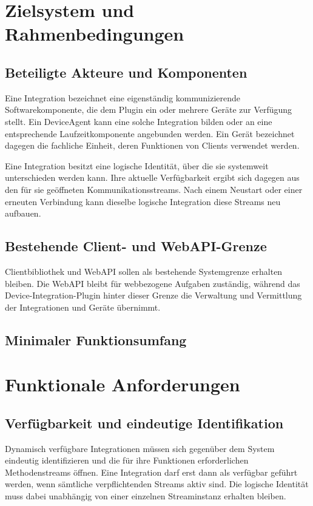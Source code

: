 \section{Zielsystem und Rahmenbedingungen}

\subsection{Beteiligte Akteure und Komponenten}

Eine Integration bezeichnet eine eigenständig kommunizierende Softwarekomponente, die dem Plugin ein oder mehrere Geräte zur Verfügung stellt. Ein DeviceAgent kann eine solche Integration bilden oder an eine entsprechende Laufzeitkomponente angebunden werden. Ein Gerät bezeichnet dagegen die fachliche Einheit, deren Funktionen von Clients verwendet werden.

Eine Integration besitzt eine logische Identität, über die sie systemweit unterschieden werden kann. Ihre aktuelle Verfügbarkeit ergibt sich dagegen aus den für sie geöffneten Kommunikationsstreams. Nach einem Neustart oder einer erneuten Verbindung kann dieselbe logische Integration diese Streams neu aufbauen.

\subsection{Bestehende Client- und WebAPI-Grenze}

Clientbibliothek und WebAPI sollen als bestehende Systemgrenze erhalten bleiben. Die WebAPI bleibt für webbezogene Aufgaben zuständig, während das Device-Integration-Plugin hinter dieser Grenze die Verwaltung und Vermittlung der Integrationen und Geräte übernimmt.

\subsection{Minimaler Funktionsumfang}

\section{Funktionale Anforderungen}

\subsection{Verfügbarkeit und eindeutige Identifikation}

Dynamisch verfügbare Integrationen müssen sich gegenüber dem System eindeutig identifizieren und die für ihre Funktionen erforderlichen Methodenstreams öffnen. Eine Integration darf erst dann als verfügbar geführt werden, wenn sämtliche verpflichtenden Streams aktiv sind. Die logische Identität muss dabei unabhängig von einer einzelnen Streaminstanz erhalten bleiben.

